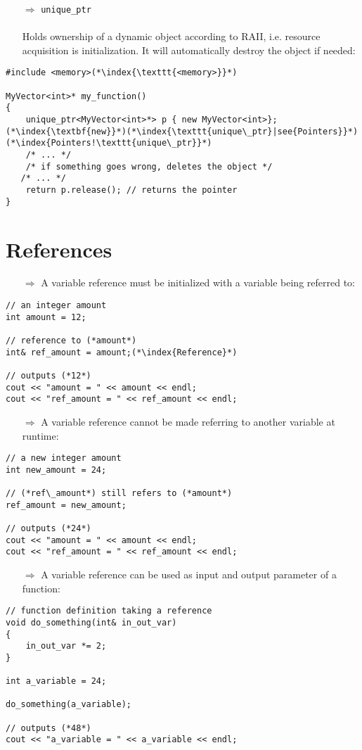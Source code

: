 \documentclass[10pt]{article}
\begin{document}
\begin{enumerate}
\item[$\Rightarrow$] \texttt{unique\_ptr}\\ \\
Holds ownership of a dynamic object according to RAII, i.e. resource acquisition is initialization. It will 
automatically destroy the object if needed:
\end{enumerate}
\begin{lstlisting}
#include <memory>(*\index{\texttt{<memory>}}*)

MyVector<int>* my_function()
{
    unique_ptr<MyVector<int>*> p { new MyVector<int>};(*\index{\textbf{new}}*)(*\index{\texttt{unique\_ptr}|see{Pointers}}*)(*\index{Pointers!\texttt{unique\_ptr}}*)
    /* ... */
    /* if something goes wrong, deletes the object */
   /* ... */   
    return p.release(); // returns the pointer
}
\end{lstlisting}
%
%
\section{References}
\small
\begin{enumerate}
\item[$\Rightarrow$] A variable reference must be initialized with a variable being referred to:
\end{enumerate}
\begin{lstlisting}
// an integer amount
int amount = 12;

// reference to (*amount*)
int& ref_amount = amount;(*\index{Reference}*)

// outputs (*12*)
cout << "amount = " << amount << endl;
cout << "ref_amount = " << ref_amount << endl;
\end{lstlisting}
\begin{enumerate}
\item[$\Rightarrow$] A variable reference cannot be made referring to another variable at runtime:
\end{enumerate}
\begin{lstlisting}
// a new integer amount
int new_amount = 24;

// (*ref\_amount*) still refers to (*amount*)
ref_amount = new_amount;

// outputs (*24*)
cout << "amount = " << amount << endl;
cout << "ref_amount = " << ref_amount << endl;
\end{lstlisting}
\begin{enumerate}
\item[$\Rightarrow$] A variable reference can be used as input and output parameter of a function:
\end{enumerate}
\begin{lstlisting}
// function definition taking a reference
void do_something(int& in_out_var)
{
    in_out_var *= 2;
}

int a_variable = 24;

do_something(a_variable);

// outputs (*48*)
cout << "a_variable = " << a_variable << endl;
\end{lstlisting}
%
%
\end{document}
